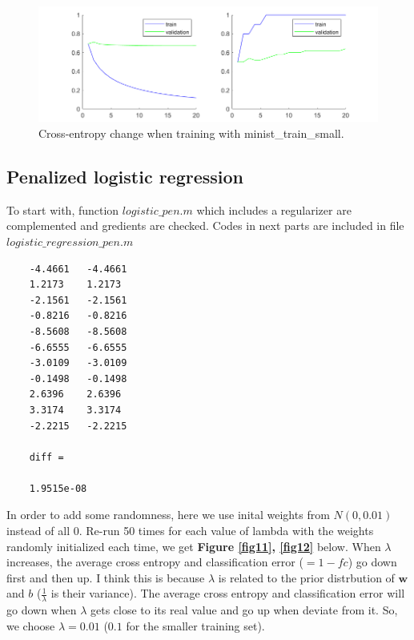 \documentclass{article}
\begin{document}
\begin{figure}[H]
	\centering
	\includegraphics[scale=0.75]{figure10}
	\caption{Cross-entropy change when training with minist\_train\_small.}
	\label{fig10}
\end{figure}


\subsection{Penalized logistic regression}

To start with, function $logistic\_pen.m$ which includes a regularizer are complemented and gredients are checked. Codes in next parts are included in file $logistic\_regression\_pen.m$\par

\begin{commandline}
	\begin{verbatim}
	-4.4661   -4.4661
	1.2173    1.2173
	-2.1561   -2.1561
	-0.8216   -0.8216
	-8.5608   -8.5608
	-6.6555   -6.6555
	-3.0109   -3.0109
	-0.1498   -0.1498
	2.6396    2.6396
	3.3174    3.3174
	-2.2215   -2.2215

	diff =

	1.9515e-08
	\end{verbatim}
\end{commandline}

In order to add some randomness, here we use inital weights from $N(0,0.01)$ instead of all $0$. Re-run 50 times for each value of lambda with the weights randomly initialized each time, we get \textbf{Figure \ref{fig11}, \ref{fig12}} below. When $\lambda$ increases, the average cross entropy and classification error ($=1-fc$) go down first and then up. I think this is because $\lambda$ is related to the prior distrbution of $\bm{w}$ and $b$ ($\frac{1}{\lambda}$ is their variance). The average cross entropy and classification error will go down when $\lambda$ gets close to its real value and go up when deviate from it. So, we choose $\lambda=0.01$ ($0.1$ for the smaller training set).
\end{document}
